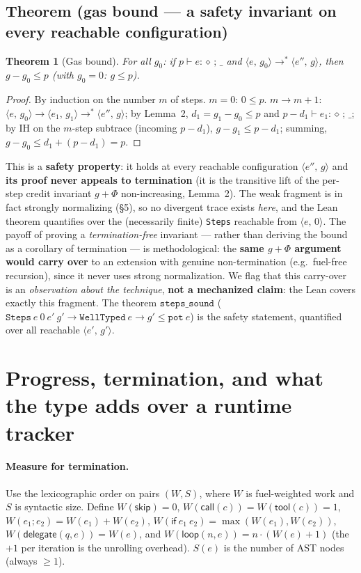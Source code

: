 \documentclass[11pt]{article}
\theoremstyle{plain}
\newtheorem*{theoremU}{Theorem}
\newcommand{\kw}[1]{\mathsf{#1}}                      %
\newcommand{\J}[3]{#1 \vdash #2 : \diamond\,;\,#3}    %
\newcommand{\cfg}[2]{\langle #1,\, #2\rangle}          %
\begin{document}
\subsection{Theorem (gas bound --- a safety invariant on every reachable configuration)}

\begin{theoremU}[Gas bound]
For all $g_0$: if $\J{p}{e}{\_}$ and $\cfg{e}{g_0} \to^{*} \cfg{e''}{g}$, then $g - g_0 \le p$
(with $g_0 = 0$: $g \le p$).
\end{theoremU}

\begin{proof}
By induction on the number $m$ of steps. $m = 0$: $0 \le p$. $m \to m+1$:
$\cfg{e}{g_0} \to \cfg{e_1}{g_1} \to^{*} \cfg{e''}{g}$; by Lemma~2, $d_1 = g_1 - g_0 \le p$ and
$\J{p - d_1}{e_1}{\_}$; by IH on the $m$-step subtrace (incoming $p - d_1$),
$g - g_1 \le p - d_1$; summing, $g - g_0 \le d_1 + (p - d_1) = p$.
\end{proof}

This is a \textbf{safety property}: it holds at every reachable configuration $\cfg{e''}{g}$ and
\textbf{its proof never appeals to termination} (it is the transitive lift of the per-step credit
invariant $g + \Phi$ non-increasing, Lemma~2). The weak fragment is in fact strongly normalizing
(\S5), so no divergent trace exists \emph{here}, and the Lean theorem quantifies over the
(necessarily finite) \texttt{Steps} reachable from $\cfg{e}{0}$. The payoff of proving a
\emph{termination-free} invariant --- rather than deriving the bound as a corollary of termination
--- is methodological: the \textbf{same $g + \Phi$ argument would carry over} to an extension with
genuine non-termination (e.g.\ fuel-free recursion), since it never uses strong normalization. We
flag that this carry-over is an \emph{observation about the technique}, \textbf{not a mechanized
claim}: the Lean covers exactly this fragment. The theorem
$\texttt{steps\_sound}$
($\texttt{Steps}\ e\ 0\ e'\ g' \to \texttt{WellTyped}\ e \to g' \le \texttt{pot}\ e$)
is the safety statement, quantified over all reachable $\cfg{e'}{g'}$.

\section{Progress, termination, and what the type adds over a runtime tracker}

\paragraph{Measure for termination.}
Use the lexicographic order on pairs $(W, S)$, where $W$ is fuel-weighted work and $S$ is syntactic
size. Define $W(\kw{skip}) = 0$, $W(\kw{call}(c)) = W(\kw{tool}(c)) = 1$,
$W(e_1 ; e_2) = W(e_1) + W(e_2)$, $W(\kw{if}\ e_1\ e_2) = \max(W(e_1), W(e_2))$,
$W(\kw{delegate}(q, e)) = W(e)$, and $W(\kw{loop}(n, e)) = n \cdot (W(e) + 1)$ (the $+1$ per
iteration is the unrolling overhead). $S(e)$ is the number of AST nodes (always $\ge 1$).
\end{document}
